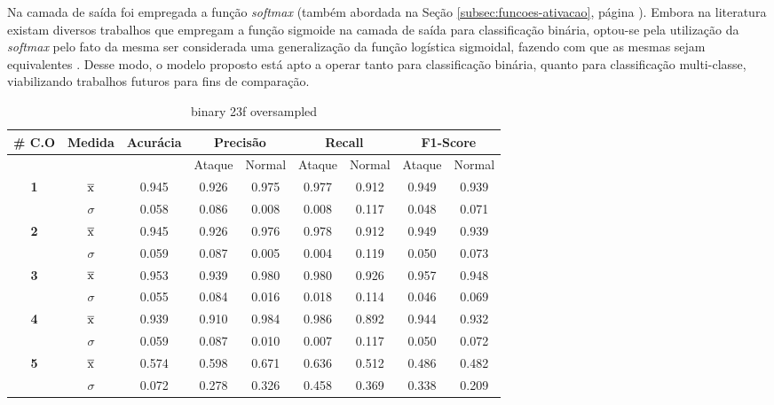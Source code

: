 Na camada de saída foi empregada a função \textit{softmax} (também abordada na Seção \ref{subsec:funcoes-ativacao}, página \pageref{subsec:funcoes-ativacao}). Embora na literatura existam diversos trabalhos que empregam a função sigmoide na camada de saída para classificação binária, optou-se pela utilização da \textit{softmax} pelo fato da mesma ser considerada uma generalização da função logística sigmoidal, fazendo com que as mesmas sejam equivalentes \cite{nwankpa2018}. Desse modo, o modelo proposto está apto a operar tanto para classificação binária, quanto para classificação multi-classe, viabilizando trabalhos futuros para fins de comparação.

\begin{table}[htb]
    \centering
    \begin{tabular}{c|c|c|cc|cc|cc}
        \hline
        \# \textbf{C.O} & \textbf{Medida} & \textbf{Acurácia} & \multicolumn{2}{c|}{ \textbf{Precisão} } & \multicolumn{2}{c|}{ \textbf{Recall} } & \multicolumn{2}{c}{ \textbf{F1-Score} } \\
        \hline
        & & & Ataque & Normal & Ataque & Normal & Ataque & Normal \\
        \hline
        \multirow{2}{*}{ \textbf{1} } & $ \overline{\rm x} $ & 0.945 & 0.926 & 0.975 & 0.977 & 0.912 & 0.949 & 0.939 \\
        & $\sigma$ & 0.058 & 0.086 & 0.008 & 0.008 & 0.117 & 0.048 & 0.071 \\
        \hline
        \multirow{2}{*}{ \textbf{2} } & $ \overline{\rm x} $ & 0.945 & 0.926 & 0.976 & 0.978 & 0.912 & 0.949 & 0.939 \\
        & $\sigma$ & 0.059 & 0.087 & 0.005 & 0.004 & 0.119 & 0.050 & 0.073 \\
        \hline
        \multirow{2}{*}{ \textbf{3} } & $ \overline{\rm x} $ & 0.953 & 0.939 & 0.980 & 0.980 & 0.926 & 0.957 & 0.948 \\
        & $\sigma$ & 0.055 & 0.084 & 0.016 & 0.018 & 0.114 & 0.046 & 0.069 \\
        \hline
        \multirow{2}{*}{ \textbf{4} } & $ \overline{\rm x} $ & 0.939 & 0.910 & 0.984 & 0.986 & 0.892 & 0.944 & 0.932 \\
        & $\sigma$ & 0.059 & 0.087 & 0.010 & 0.007 & 0.117 & 0.050 & 0.072 \\
        \hline
        \multirow{2}{*}{ \textbf{5} } & $ \overline{\rm x} $ & 0.574 & 0.598 & 0.671 & 0.636 & 0.512 & 0.486 & 0.482 \\
        & $\sigma$ & 0.072 & 0.278 & 0.326 & 0.458 & 0.369 & 0.338 & 0.209 \\
        \hline
    \end{tabular} 
    \caption{binary 23f oversampled}
\end{table}

